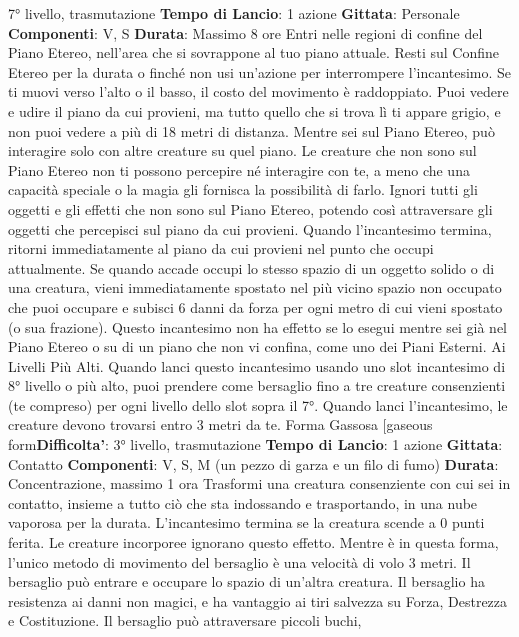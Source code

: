 \begin{multicols}{2}
7° livello, trasmutazione
\textbf{Tempo di Lancio}: 1 azione
\textbf{Gittata}: Personale
\textbf{Componenti}: V, S
\textbf{Durata}: Massimo 8 ore
Entri nelle regioni di confine del Piano Etereo, nell’area
che si sovrappone al tuo piano attuale. Resti sul
Confine Etereo per la durata o finché non usi un’azione
per interrompere l’incantesimo. Se ti muovi verso l’alto
o il basso, il costo del movimento è raddoppiato. Puoi
vedere e udire il piano da cui provieni, ma tutto quello
che si trova lì ti appare grigio, e non puoi vedere a più
di 18 metri di distanza.
Mentre sei sul Piano Etereo, può interagire solo con
altre creature su quel piano. Le creature che non sono
sul Piano Etereo non ti possono percepire né interagire
con te, a meno che una capacità speciale o la magia gli
fornisca la possibilità di farlo.
Ignori tutti gli oggetti e gli effetti che non sono sul Piano
Etereo, potendo così attraversare gli oggetti che
percepisci sul piano da cui provieni.
Quando l’incantesimo termina, ritorni immediatamente
al piano da cui provieni nel punto che occupi
attualmente. Se quando accade occupi lo stesso spazio
di un oggetto solido o di una creatura, vieni
immediatamente spostato nel più vicino spazio non
occupato che puoi occupare e subisci 6 danni da forza
per ogni metro di cui vieni spostato (o sua frazione).
Questo incantesimo non ha effetto se lo esegui mentre
sei già nel Piano Etereo o su di un piano che non vi
confina, come uno dei Piani Esterni.
Ai Livelli Più Alti. Quando lanci questo incantesimo
usando uno slot incantesimo di 8° livello o più alto, puoi
prendere come bersaglio fino a tre creature
consenzienti (te compreso) per ogni livello dello slot
sopra il 7°. Quando lanci l’incantesimo, le creature
devono trovarsi entro 3 metri da te.
Forma Gassosa
[gaseous form\textbf{Difficolta'}:
3° livello, trasmutazione
\textbf{Tempo di Lancio}: 1 azione
\textbf{Gittata}: Contatto
\textbf{Componenti}: V, S, M (un pezzo di garza e un filo di
fumo)
\textbf{Durata}: Concentrazione, massimo 1 ora
Trasformi una creatura consenziente con cui sei in
contatto, insieme a tutto ciò che sta indossando e
trasportando, in una nube vaporosa per la durata.
L’incantesimo termina se la creatura scende a 0 punti
ferita. Le creature incorporee ignorano questo effetto.
Mentre è in questa forma, l’unico metodo di movimento
del bersaglio è una velocità di volo 3 metri. Il bersaglio
può entrare e occupare lo spazio di un’altra creatura. Il
bersaglio ha resistenza ai danni non magici, e ha
vantaggio ai tiri salvezza su Forza, Destrezza e
Costituzione. Il bersaglio può attraversare piccoli buchi,

\end{multicols}
